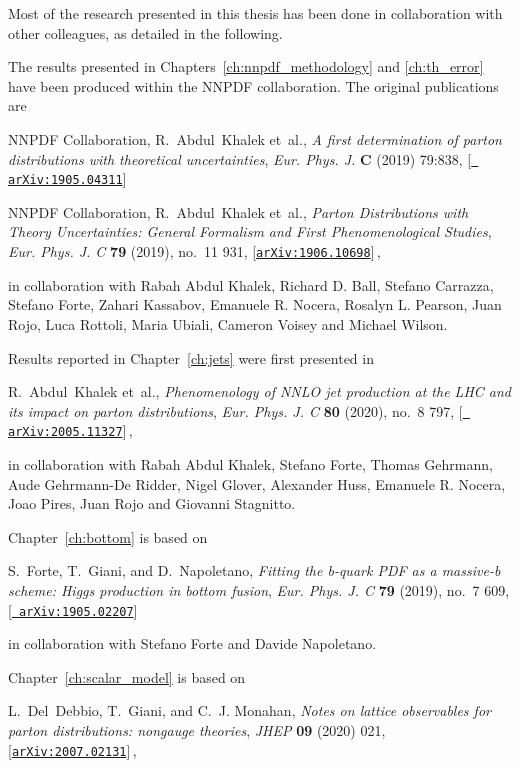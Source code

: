
Most of the research presented in this thesis has been done in collaboration with other colleagues,
as detailed in the following.

The results presented in Chapters~\ref{ch:nnpdf_methodology} and \ref{ch:th_error}
have been produced within the NNPDF collaboration. The original publications are

NNPDF Collaboration, R.~Abdul~Khalek et~al., {\it {A first determination
  of parton distributions with theoretical uncertainties}},  {\em Eur. Phys.
  J.} {\bf C} (2019) 79:838, [\href{http://arxiv.org/abs/1905.04311}{{\tt
  arXiv:1905.04311}}]

NNPDF Collaboration, R.~Abdul~Khalek et~al., {\it {Parton Distributions
  with Theory Uncertainties: General Formalism and First Phenomenological
  Studies}},  {\em Eur. Phys. J. C} {\bf 79} (2019), no.~11 931,
  [\href{http://arxiv.org/abs/1906.10698}{{\tt arXiv:1906.10698}}]\,,

in collaboration with Rabah Abdul Khalek, Richard D. Ball, Stefano Carrazza, Stefano Forte,
Zahari Kassabov, Emanuele R. Nocera, Rosalyn L. Pearson, Juan Rojo, Luca Rottoli,
Maria Ubiali, Cameron Voisey and Michael Wilson.


Results reported in Chapter~\ref{ch:jets} were first presented in 

R.~Abdul~Khalek et~al., {\it {Phenomenology of NNLO jet production at the LHC
  and its impact on parton distributions}},  {\em Eur. Phys. J. C} {\bf 80}
  (2020), no.~8 797, [\href{http://arxiv.org/abs/2005.11327}{{\tt
  arXiv:2005.11327}}]\,,

in collaboration with Rabah Abdul Khalek, Stefano Forte, Thomas Gehrmann, Aude Gehrmann-De Ridder,
Nigel Glover, Alexander Huss, Emanuele R. Nocera, Joao Pires, Juan Rojo and Giovanni Stagnitto.

Chapter~\ref{ch:bottom} is based on

S.~Forte, T.~Giani, and D.~Napoletano, {\it {Fitting the b-quark PDF as a
  massive-b scheme: Higgs production in bottom fusion}},  {\em Eur. Phys. J. C}
  {\bf 79} (2019), no.~7 609, [\href{http://arxiv.org/abs/1905.02207}{{\tt
  arXiv:1905.02207}}]

in collaboration with Stefano Forte and Davide Napoletano.

Chapter~\ref{ch:scalar_model} is based on

L.~Del~Debbio, T.~Giani, and C.~J. Monahan, {\it {Notes on lattice observables
  for parton distributions: nongauge theories}},  {\em JHEP} {\bf 09} (2020)
  021, [\href{http://arxiv.org/abs/2007.02131}{{\tt arXiv:2007.02131}}]\,,

